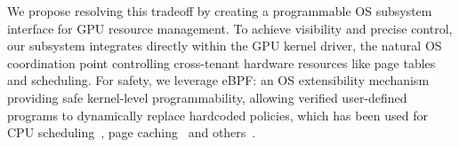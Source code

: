 We propose resolving this tradeoff by creating a programmable OS subsystem interface for GPU resource management. To achieve visibility and precise control, our subsystem integrates directly within the GPU kernel driver, the natural OS coordination point controlling cross-tenant hardware resources like page tables and scheduling. For safety, we leverage eBPF: an OS extensibility mechanism providing safe kernel-level programmability, allowing verified user-defined programs to dynamically replace hardcoded policies, which has been used for CPU scheduling~\cite{schedext-docs}, page caching~\cite{zussman2025cache_ext} and others~\cite{bachl2021flow,Zhong22,jia2023programmable}.


